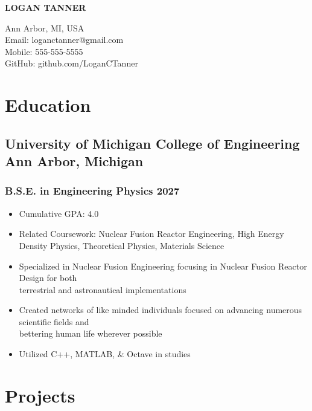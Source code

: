 \documentclass[10pt]{article} %
\begin{document}
\begin{center}
    \begin{minipage}{0.5\textwidth}
        {\huge\bfseries
            LOGAN TANNER 
        } \\ \medskip
    \end{minipage} \hfill
    \begin{minipage}{0.4\textwidth}
        \raggedleft
        Ann Arbor, MI, USA\\
        Email: loganctanner@gmail.com\\
        Mobile: 555-555-5555\\
        GitHub: github.com/LoganCTanner
    \end{minipage}
\end{center}

\section{Education}
\subsection{University of Michigan College of Engineering \hfill Ann Arbor, Michigan}
\subsubsection{B.S.E. in Engineering Physics \hfill 2027}
\begin{itemize}
    \item {Cumulative GPA: 4.0}
    \item {Related Coursework: Nuclear Fusion Reactor Engineering, 
        High Energy Density Physics, Theoretical Physics, Materials Science} 
    \item {Specialized in Nuclear Fusion Engineering focusing in Nuclear 
        Fusion Reactor Design for both  \\ terrestrial and astronautical implementations}
    \item {Created networks of like minded individuals focused on advancing
        numerous scientific fields and \\ bettering human life wherever possible}
    \item {Utilized C++, MATLAB, \& Octave in studies}    
\end{itemize}

\section{Projects}
\end{document}
